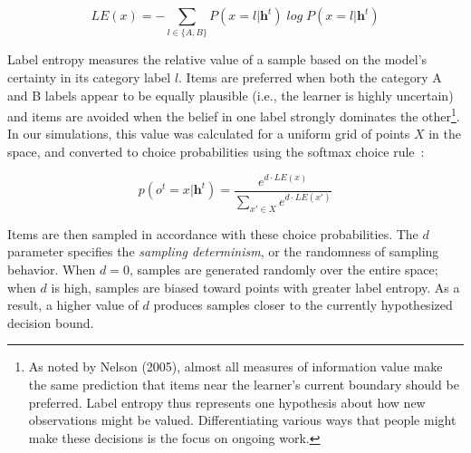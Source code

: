 \documentclass[3p,twocolumn,authoryear,10pt]{elsarticle}
\begin{document}
\begin{equation}
LE(x)=-\sum_{l \in \{A,B\}} P(x=l |  \textbf{h}^t) \; log \; P(x=l | \textbf{h}^t)
\label{labelentropy.eq}
\end{equation}

\noindent
Label entropy measures the relative value of a sample based on the model's certainty in its category label $l$. Items are preferred when both the category A and B labels appear to be equally plausible (i.e., the learner is highly uncertain) and items are avoided when the belief in one label strongly dominates the other\footnote{As noted by Nelson (2005), almost all measures of information value make the same prediction that items near the learner's current boundary should be preferred.  Label entropy thus represents one hypothesis about how new observations might be valued.  Differentiating various ways that people might make these decisions is the focus on ongoing work.}.   In our simulations, this value was calculated for a uniform grid of points $X$ in the space, and converted to choice probabilities using the softmax choice rule~\citep{Sutton:1998lr}:

\begin{equation}
p(o^t=x|\textbf{h}^t) = \frac{e^{d \cdot LE(x)}}{\sum\limits_{x' \in X}^{} e^{d \cdot LE(x')}}
\label{choiceprob.eq}
\end{equation}

\noindent
Items are then sampled in accordance with these choice probabilities.  The $d$ parameter specifies the \textit{sampling determinism}, or the randomness of sampling behavior. When $d=0$, samples are generated randomly over the entire space; when $d$ is high, samples are biased toward points with greater label entropy. As a result, a higher value of $d$ produces samples closer to the currently hypothesized decision bound. \\
\end{document}
